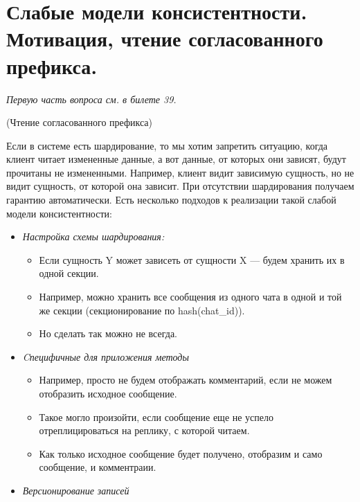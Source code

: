 \section{Слабые модели консистентности. Мотивация, чтение согласованного префикса.}

\textit{Первую часть вопроса см. в билете 39.}

\begin{example}(Чтение согласованного префикса)

Если в системе есть шардирование, то мы хотим запретить ситуацию, когда клиент читает измененные данные, а вот данные, от которых они зависят, будут прочитаны не измененными. Например, клиент видит зависимую сущность, но не видит сущность, от которой она зависит. При отсутствии шардирования получаем гарантию автоматически. Есть несколько подходов к реализации такой слабой модели консистентности:

\begin{itemize}
    \item \textit{Настройка схемы шардирования:}
    \begin{itemize}
        \item Если сущность Y может зависеть от сущности X --- будем хранить их в одной секции.
        \item Например, можно хранить все сообщения из одного чата в одной и той же секции (секционирование по hash(chat\_id)).
        \item Но сделать так можно не всегда.
    \end{itemize}

    \item \textit{Cпецифичные для приложения методы}
    \begin{itemize}
        \item Например, просто не будем отображать комментарий, если не можем отобразить исходное сообщение.
        \item Такое могло произойти, если сообщение еще не успело отреплицироваться на реплику, с которой читаем.
        \item Как только исходное сообщение будет получено, отобразим и само сообщение, и комментраии.
    \end{itemize}

    \item \textit{Версионирование записей}

\end{itemize}

\end{example}

